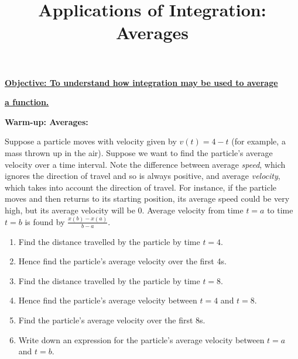 \documentclass{article}
\begin{document}
\title{Applications of Integration: Averages}
\date{}

\maketitle
\thispagestyle{empty}

\Large

\textbf{\underline{Objective: To understand how integration may be used to average}}

\textbf{\underline{a function.}}






\vspace{10mm}



\textbf{Warm-up: Averages:}\bigskip


Suppose a particle moves with velocity given by $v(t) = 4-t$ (for example, a mass thrown up in the air). Suppose we want to find the particle's average velocity over a time interval. Note the difference between average \textit{speed}, which ignores the direction of travel and so is always positive, and average \textit{velocity}, which takes into account the direction of travel. For instance, if the particle moves and then returns to its starting position, its average speed could be very high, but its average velocity will be 0. Average velocity from time $t=a$ to time $t=b$ is found by $\frac{x(b)-x(a)}{b-a}$.

\begin{enumerate}
	\item Find the distance travelled by the particle by time $t=4$.
	\item Hence find the particle's average velocity over the first 4s.
	\item Find the distance travelled by the particle by time $t=8$.
	\item Hence find the particle's average velocity between $t=4$ and $t=8$.
	\item Find the particle's average velocity over the first 8s.
	\item Write down an expression for the particle's average velocity between $t=a$ and $t=b$.
\end{enumerate}








\clearpage
\end{document}
